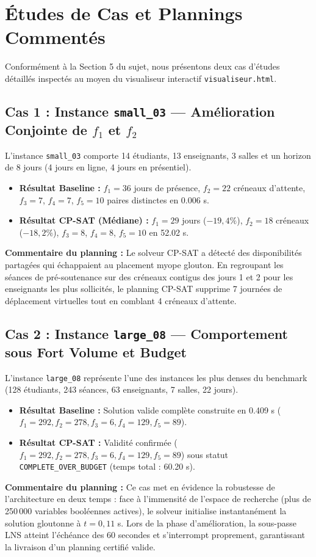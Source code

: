 \documentclass[10pt,a4paper]{article}
\begin{document}
\section{Études de Cas et Plannings Commentés}

Conformément à la Section 5 du sujet, nous présentons deux cas d'études détaillés inspectés au moyen du visualiseur interactif \texttt{visualiseur.html}.

\subsection{Cas 1 : Instance \texttt{small\_03} --- Amélioration Conjointe de $f_1$ et $f_2$}
L'instance \texttt{small\_03} comporte 14 étudiants, 13 enseignants, 3 salles et un horizon de 8 jours (4 jours en ligne, 4 jours en présentiel).
\begin{itemize}
    \item \textbf{Résultat Baseline :} $f_1 = 36$ jours de présence, $f_2 = 22$ créneaux d'attente, $f_3 = 7$, $f_4 = 7$, $f_5 = 10$ paires distinctes en 0.006 s.
    \item \textbf{Résultat CP-SAT (Médiane) :} $f_1 = 29$ jours ($-19{,}4\%$), $f_2 = 18$ créneaux ($-18{,}2\%$), $f_3 = 8$, $f_4 = 8$, $f_5 = 10$ en 52.02 s.
\end{itemize}
\textbf{Commentaire du planning :} Le solveur CP-SAT a détecté des disponibilités partagées qui échappaient au placement myope glouton. En regroupant les séances de pré-soutenance sur des créneaux contigus des jours 1 et 2 pour les enseignants les plus sollicités, le planning CP-SAT supprime 7 journées de déplacement virtuelles tout en comblant 4 créneaux d'attente.

\subsection{Cas 2 : Instance \texttt{large\_08} --- Comportement sous Fort Volume et Budget}
L'instance \texttt{large\_08} représente l'une des instances les plus denses du benchmark (128 étudiants, 243 séances, 63 enseignants, 7 salles, 22 jours).
\begin{itemize}
    \item \textbf{Résultat Baseline :} Solution valide complète construite en 0.409 s ($f_1 = 292, f_2 = 278, f_3 = 6, f_4 = 129, f_5 = 89$).
    \item \textbf{Résultat CP-SAT :} Validité confirmée ($f_1 = 292, f_2 = 278, f_3 = 6, f_4 = 129, f_5 = 89$) sous statut \texttt{COMPLETE\_OVER\_BUDGET} (temps total : 60.20 s).
\end{itemize}
\textbf{Commentaire du planning :} Ce cas met en évidence la robustesse de l'architecture en deux temps : face à l'immensité de l'espace de recherche (plus de 250\,000 variables booléennes actives), le solveur initialise instantanément la solution gloutonne à $t=0{,}11$ s. Lors de la phase d'amélioration, la sous-passe LNS atteint l'échéance des 60 secondes et s'interrompt proprement, garantissant la livraison d'un planning certifié valide.
\end{document}
